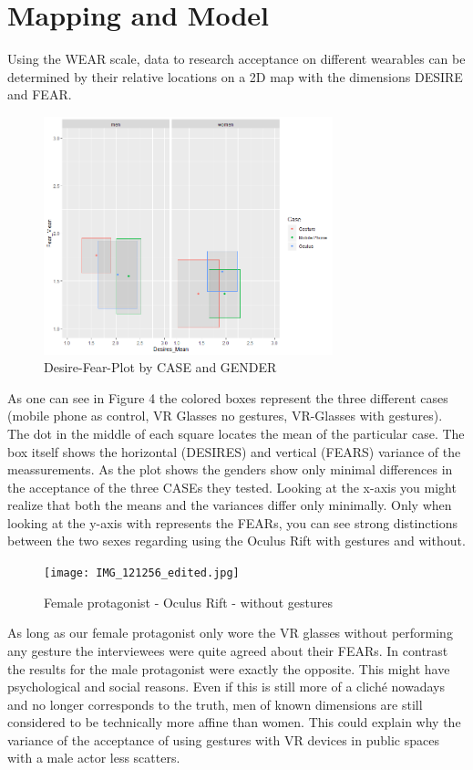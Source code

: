 \documentclass[sigchi]{acmart}
\begin{document}
\section {Mapping and Model}
Using the WEAR scale, data to research acceptance on different wearables can be determined by their relative locations on a 2D map with the dimensions DESIRE and FEAR.

\begin{figure}[h]
\includegraphics[width=84mm]{scmplot_v4.png} 
\caption{Desire-Fear-Plot by CASE and GENDER}
\end{figure}

As one can see in Figure 4 the colored boxes represent the three different cases  (mobile phone as control, VR Glasses no gestures, VR-Glasses with gestures). The dot in the middle of each square locates the mean of the particular case. The box itself shows the horizontal (DESIRES) and vertical (FEARS) variance of the meassurements. As the plot shows the genders show only minimal differences in the acceptance of the three CASEs they tested. Looking at the x-axis you might realize that both the means and the variances differ only minimally. Only when looking at the y-axis with represents the FEARs, you can see strong distinctions between the two sexes regarding using the Oculus Rift with gestures and without.

\begin{figure}[h]
\texttt{[image: IMG\_121256\_edited.jpg]} 
\caption{Female protagonist - Oculus Rift - without gestures}
\end{figure}

 As long as our female protagonist only wore the VR glasses without performing any gesture the interviewees were quite agreed about their FEARs. In contrast the results for the male protagonist were exactly the opposite. This might have psychological and social reasons. Even if this is still more of a cliché nowadays and no longer corresponds to the truth, men of known dimensions are still considered to be technically more affine than women. This could explain why the variance of the acceptance of using gestures with VR devices in public spaces with a male actor less scatters. 
\end{document}
